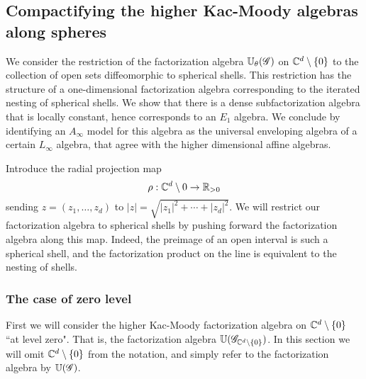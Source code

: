 \documentclass[10pt]{amsart}
\begin{document}

\subsection{Compactifying the higher Kac-Moody algebras along spheres}

We consider the restriction of the factorization algebra $\mathbb U_\theta (\mathscr G)$ on $\mathbb C^{d} \setminus \{0\}$ to the collection of open sets diffeomorphic to spherical shells.
This restriction has the structure of a one-dimensional factorization algebra corresponding to the iterated nesting of spherical shells. 
We show that there is a dense subfactorization algebra that is locally constant, hence corresponds to an $E_1$ algebra.
We conclude by identifying an $A_\infty$ model for this algebra as the universal enveloping algebra of a certain $L_\infty$ algebra, that agree with the higher dimensional affine algebras.

Introduce the radial projection map
\[
\rho : \mathbb C^d \setminus 0 \to \mathbb R_{>0}
\]
sending $z = (z_1, \ldots, z_d)$ to $|z| = \sqrt{|z_1|^2 + \cdots + |z_d|^2}$. 
We will restrict our factorization algebra to spherical shells by pushing forward the factorization algebra along this map.
Indeed, the preimage of an open interval is such a spherical shell, and the factorization product on the line is equivalent to the nesting of shells. 

\subsubsection{The case of zero level}

First we will consider the higher Kac-Moody factorization algebra on $\mathbb C^d \setminus \{0\}$ ``at level zero". That is, the factorization algebra $\mathbb U(\mathscr G_{\mathbb C^d \setminus\{0\}})$.
In this section we will omit $\mathbb C^d \setminus \{0\}$ from the notation, and simply refer to the factorization algebra by $\mathbb U(\mathscr G)$. 
\end{document}
